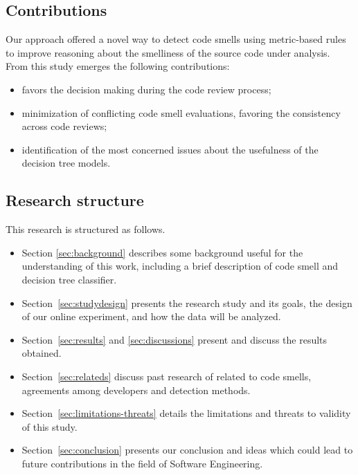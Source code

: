 \subsection{Contributions}
 
Our approach offered a novel way to detect code smells using metric-based rules to improve reasoning about the smelliness of the source code under analysis.
From this study emerges the following contributions:
     \begin{itemize}
         \item favors the decision making during the code review process;
         \item minimization of conflicting code smell evaluations, favoring the consistency across code reviews;
         \item identification of the most concerned issues about the usefulness of the decision tree models.
     \end{itemize}

\subsection{Research structure}

This research is structured as follows. 
\begin{itemize}
    \item Section \ref{sec:background} describes some background useful for the understanding of this work, including a brief description of code smell and decision tree classifier.
    
    \item Section~\ref{sec:studydesign} presents the research study and its goals, the design of our online experiment, and how the data will be analyzed.
    
    \item Section~\ref{sec:results} and \ref{sec:discussions} present and discuss the results obtained.
    
    
    \item Section~\ref{sec:relateds} discuss past research of related to code smells, agreements among developers and detection methods. 
    
    \item Section~\ref{sec:limitations-threats} details the limitations and threats to validity of this study.
    
    \item Section~\ref{sec:conclusion} presents our conclusion and ideas which could lead to future contributions in the field of Software Engineering.
\end{itemize}
